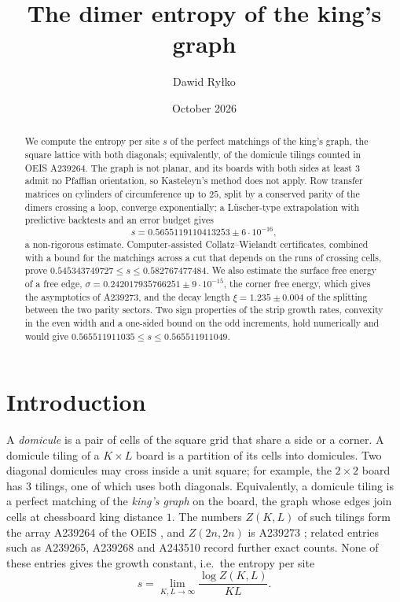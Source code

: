 \documentclass[11pt]{amsart}
\title{The dimer entropy of the king's graph}
\author{Dawid Ry\l{}ko}
\date{October 2026}
\theoremstyle{definition}
\theoremstyle{remark}
\begin{document}
\begin{abstract}
We compute the entropy per site $s$ of the perfect matchings of the king's graph, the square
lattice with both diagonals; equivalently, of the domicule tilings counted in OEIS A239264. The
graph is not planar, and its boards with both sides at least $3$ admit no Pfaffian orientation, so
Kasteleyn's method does not apply. Row transfer matrices on cylinders of circumference up to $25$,
split by a conserved parity of the dimers crossing a loop, converge exponentially; a L\"uscher-type
extrapolation with predictive backtests and an error budget gives
\[
  s = 0.5655119110413253 \pm 6\cdot 10^{-16},
\]
a non-rigorous estimate. Computer-assisted Collatz--Wielandt certificates, combined with a bound
for the matchings across a cut that depends on the runs of crossing cells, prove
$0.545343749727 \le s \le 0.582767477484$. We also estimate the surface free energy of a free edge,
$\sigma = 0.242017935766251 \pm 9\cdot 10^{-15}$, the corner free energy, which gives the asymptotics of
A239273, and the decay length $\xi = 1.235 \pm 0.004$ of the splitting between the two parity
sectors. Two sign properties of the strip growth rates, convexity in the even width and a
one-sided bound on the odd increments, hold numerically and would give
$0.565511911035 \le s \le 0.565511911049$.
\end{abstract}

\maketitle

\section{Introduction}

A \emph{domicule} is a pair of cells of the square grid that share a side or a corner. A domicule
tiling of a $K \times L$ board is a partition of its cells into domicules. Two diagonal domicules
may cross inside a unit square; for example, the $2\times 2$ board has $3$ tilings, one of which
uses both diagonals. Equivalently, a domicule tiling is a
perfect matching of the \emph{king's graph} on the board, the graph whose edges join cells at
chessboard king distance $1$. The numbers $Z(K, L)$ of such tilings form the array
A239264 of the OEIS \cite{oeisA239264}, and $Z(2n, 2n)$ is A239273 \cite{oeisA239273}; related
entries such as A239265, A239268 and A243510 \cite{oeisA239265,oeisA239268,oeisA243510} record
further exact counts. None of these entries gives the growth constant, i.e.\ the entropy per
site
\[
  s = \lim_{K, L \to \infty} \frac{\log Z(K, L)}{KL}.
\]
\end{document}

